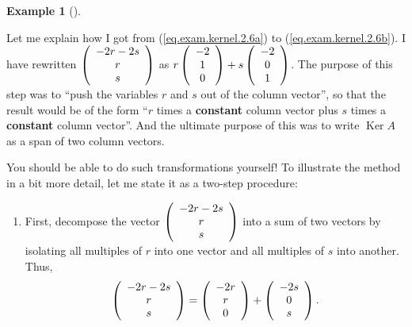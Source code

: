 \documentclass[numbers=enddot,12pt,final,onecolumn,notitlepage]{scrartcl}%
\theoremstyle{definition}
\newtheorem{exam}[theo]{Example}
\newenvironment{example}[1][]
{\begin{exam}[#1]\begin{leftbar}}
{\end{leftbar}\end{exam}}
\begin{document}
\begin{example}
Let me explain how I got from (\ref{eq.exam.kernel.2.6a}) to
(\ref{eq.exam.kernel.2.6b}). I have rewritten $\left(
\begin{array}
[c]{c}%
-2r-2s\\
r\\
s
\end{array}
\right)  $ as $r\left(
\begin{array}
[c]{c}%
-2\\
1\\
0
\end{array}
\right)  +s\left(
\begin{array}
[c]{c}%
-2\\
0\\
1
\end{array}
\right)  $. The purpose of this step was to \textquotedblleft push the
variables $r$ and $s$ out of the column vector\textquotedblright, so that the
result would be of the form \textquotedblleft$r$ times a \textbf{constant}
column vector plus $s$ times a \textbf{constant} column
vector\textquotedblright. And the ultimate purpose of this was to write
$\operatorname*{Ker}A$ as a span of two column vectors.

You should be able to do such transformations yourself! To illustrate the
method in a bit more detail, let me state it as a two-step procedure:

\begin{enumerate}
\item First, decompose the vector $\left(
\begin{array}
[c]{c}%
-2r-2s\\
r\\
s
\end{array}
\right)  $ into a sum of two vectors by isolating all multiples of $r$ into
one vector and all multiples of $s$ into another. Thus,%
\[
\left(
\begin{array}
[c]{c}%
-2r-2s\\
r\\
s
\end{array}
\right)  =\left(
\begin{array}
[c]{c}%
-2r\\
r\\
0
\end{array}
\right)  +\left(
\begin{array}
[c]{c}%
-2s\\
0\\
s
\end{array}
\right)  .
\]



\end{enumerate}
\end{example}
\end{document}
